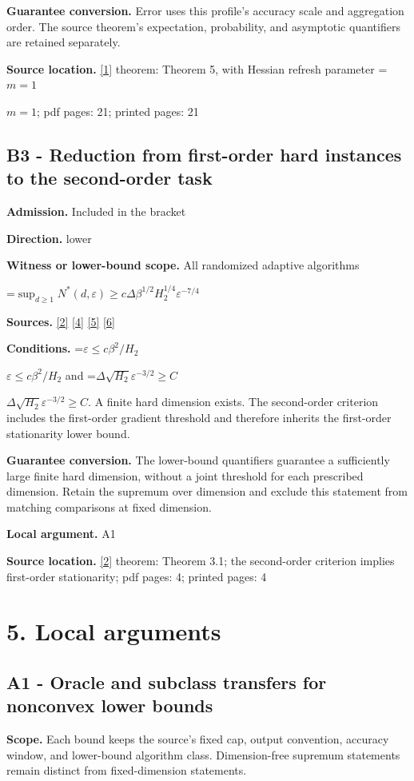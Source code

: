 \documentclass[10pt,a4paper]{article}
\newcommand{\AtlasMath}[1]{\par\begingroup\centering\setbox0=\hbox{$\displaystyle #1$}\ifdim\wd0>1.4\linewidth\typeout{ATLAS WIDE FORMULA: \the\wd0}\fi\ifdim\wd0>\linewidth\resizebox{\linewidth}{!}{\box0}\else\box0\fi\par\endgroup}
\newcommand{\AtlasInlineMath}[1]{\begingroup\setbox0=\hbox{$#1$}\ifdim\wd0>.4\linewidth\endgroup\AtlasMath{#1}\else\endgroup$#1$\fi}
\begin{document}
\textbf{Guarantee conversion.} Error uses this profile's accuracy scale and aggregation order. The source theorem's expectation, probability, and asymptotic quantifiers are retained separately.

\textbf{Source location.} \href{https://link.springer.com/article/10.1007/s10915-025-02842-z}{[1]} theorem: Theorem 5, with Hessian refresh parameter \AtlasInlineMath{m=1}; pdf pages: 21; printed pages: 21

\subsection{B3 - Reduction from first-order hard instances to the second-order task}
\textbf{Admission.} Included in the bracket

\textbf{Direction.} lower

\textbf{Witness or lower-bound scope.} All randomized adaptive algorithms

\AtlasMath{\sup_{d\ge1}N^*(d,\varepsilon)\ge c\Delta\beta^{1/2}H_2^{1/4}\varepsilon^{-7/4}}
\textbf{Sources.} \href{https://arxiv.org/pdf/2610.00245v2}{[2]} \href{https://arxiv.org/html/2610.19652v1}{[4]} \href{https://arxiv.org/html/2609.00045v3}{[5]} \href{https://arxiv.org/html/2610.17074v1}{[6]}

\textbf{Conditions.} \AtlasInlineMath{\varepsilon\le c\beta^2/H_2} and \AtlasInlineMath{\Delta\sqrt{H_2}\varepsilon^{-3/2}\ge C}. A finite hard dimension exists. The second-order criterion includes the first-order gradient threshold and therefore inherits the first-order stationarity lower bound.

\textbf{Guarantee conversion.} The lower-bound quantifiers guarantee a sufficiently large finite hard dimension, without a joint threshold for each prescribed dimension. Retain the supremum over dimension and exclude this statement from matching comparisons at fixed dimension.

\textbf{Local argument.} A1

\textbf{Source location.} \href{https://arxiv.org/pdf/2610.00245v2}{[2]} theorem: Theorem 3.1; the second-order criterion implies first-order stationarity; pdf pages: 4; printed pages: 4

\section{5. Local arguments}
\subsection{A1 - Oracle and subclass transfers for nonconvex lower bounds}
\textbf{Scope.} Each bound keeps the source's fixed cap, output convention, accuracy window, and lower-bound algorithm class. Dimension-free supremum statements remain distinct from fixed-dimension statements.
\end{document}

